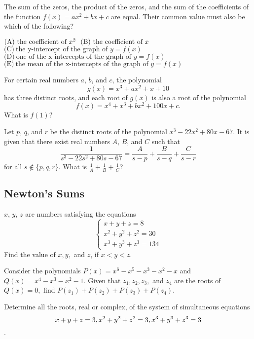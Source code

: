 \documentclass[sexy]{scrartcl}
\begin{document}
\begin{exercise}[AMC 12A 2007/21]
The sum of the zeros, the product of the zeros, and the sum of the coefficients of the function $f(x)=ax^{2}+bx+c$ are equal. Their common value must also be which of the following?

\noindent
$\textrm{(A)}\ \textrm{the\ coefficient\ of\ }x^{2}~~~ \\ \textrm{(B)}\ \textrm{the\ coefficient\ of\ }x$ \\ $\textrm{(C)}\ \textrm{the\ y-intercept\ of\ the\ graph\ of\ }y=f(x)$ \\ $\textrm{(D)}\ \textrm{one\ of\ the\ x-intercepts\ of\ the\ graph\ of\ }y=f(x)$ \\ $\textrm{(E)}\ \textrm{the\ mean\ of\ the\ x-intercepts\ of\ the\ graph\ of\ }y=f(x)$
\end{exercise} %

\begin{exercise}[AMC 12A 2017/23]
For certain real numbers $a$, $b$, and $c$, the polynomial\[g(x) = x^3 + ax^2 + x + 10\]has three distinct roots, and each root of $g(x)$ is also a root of the polynomial\[f(x) = x^4 + x^3 + bx^2 + 100x + c.\]What is $f(1)$?
\end{exercise} %

\begin{exercise}[2019 AMC 10A] 
Let $p$, $q$, and $r$ be the distinct roots of the polynomial $x^3 - 22x^2 + 80x - 67$. It is given that there exist real numbers $A$, $B$, and $C$ such that\[\dfrac{1}{s^3 - 22s^2 + 80s - 67} = \dfrac{A}{s-p} + \dfrac{B}{s-q} + \frac{C}{s-r}\]for all $s\not\in\{p,q,r\}$. What is $\tfrac1A+\tfrac1B+\tfrac1C$?
\end{exercise} %

\subsection{Newton's Sums}
\begin{exercise}
$x$, $y$, $z$ are numbers satisfying the equations $$\begin{cases} x+y+z=8 \\ x^2+y^2+z^2=30 \\ x^3+y^3+z^3=134 \end{cases}$$
Find the value of $x, y, $ and $z$, if $x<y<z$. 
\end{exercise} %
\begin{exercise} [AIME II 2003]
Consider the polynomials $P(x) = x^{6} - x^{5} - x^{3} - x^{2} - x$ and $Q(x) = x^{4} - x^{3} - x^{2} - 1.$ Given that $z_{1},z_{2},z_{3},$ and $z_{4}$ are the roots of $Q(x) = 0,$ find $P(z_{1}) + P(z_{2}) + P(z_{3}) + P(z_{4}).$
\end{exercise}
\begin{exercise} [USAMO 1973]
Determine all the roots, real or complex, of the system of simultaneous equations
$$x+y+z=3,
\\x^2+y^2+z^2=3,
\\x^3+y^3+z^3=3$$.
\end{exercise}
\end{document}
